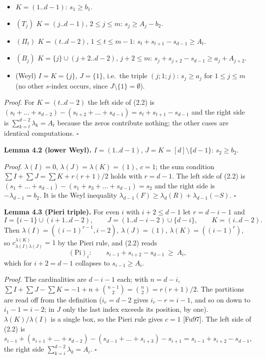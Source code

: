 \documentclass[
  11pt,
  a4paper,
]{article}
\providecommand{\tightlist}{%
  \setlength{\itemsep}{0pt}\setlength{\parskip}{0pt}}
\begin{document}
\begin{itemize}
\tightlist
\item
  \(K=(1..d-1)\): \(s_1\ge b_1\).
\item
  \((T_j)\) \(K=(j..d-1)\), \(2\le j\le m\): \(s_j\ge A_j-b_2\).
\item
  \((\Pi_t)\) \(K=(t..d-2)\), \(1\le t\le m-1\):
  \(s_t+s_{t+1}-s_{d-1}\ge A_t\).
\item
  \((B_j)\) \(K=\{j\}\cup(j+2..d-2)\), \(j+2\le m\):
  \(s_j+s_{j+2}-s_{d-1}\ge a_j+A_{j+2}\).
\item
  (Weyl) \(I=K=\{j\}\), \(J=\{1\}\), i.e.~the triple \((j;\allowbreak{}1;\allowbreak{}j)\):
  \(s_j\ge a_j\) for \(1\le j\le m\) (no other \(s\)-index occurs, since
  \(J\setminus\{1\}=\emptyset\)).
\end{itemize}

\emph{Proof.} For \(K=(t..d-2)\) the left side of (2.2) is
\((s_t+\dots+s_{d-2})-(s_{t+2}+\dots+s_{d-1})=s_t+s_{t+1}-s_{d-1}\) and
the right side is \(\sum_{k=t}^{d-2}\lambda_k=A_t\) because the zeros
contribute nothing; the other cases are identical computations.
\(\square\)

\textbf{Lemma 4.2 (lower Weyl).} \(I=(1..d-1)\),
\(J=K=[d]\setminus\{d-1\}\): \(s_2\ge b_2\).

\emph{Proof.} \(\lambda(I)=0\), \(\lambda(J)=\lambda(K)=(1)\), \(c=1\);
the sum condition \(\sum I+\sum J=\sum K+r(r+1)/2\) holds with
\(r=d-1\). The left side of (2.2) is
\((s_1+\dots+s_{d-1})-(s_1+s_3+\dots+s_{d-1})=s_2\) and the right side
is \(-\lambda_{d-1}=b_2\). It is the Weyl inequality
\(\lambda_{d-1}(F)\ge\lambda_d(R)+\lambda_{d-1}(-S)\). \(\square\)

\textbf{Lemma 4.3 (Pieri triple).} For even \(i\) with \(i+2\le d-1\)
let \(r=d-i-1\) and
\[I=\{i-1\}\cup(i+1..d-2),\qquad J=(1..d-i-2)\cup\{d-i\},\qquad K=(i..d-2).\]
Then \(\lambda(I)=((i-1)^{r-1},\allowbreak{}i-2)\), \(\lambda(J)=(1)\),
\(\lambda(K)=((i-1)^r)\), so \(c^{\lambda(K)}_{\lambda(I)\lambda(J)}=1\)
by the Pieri rule, and (2.2) reads
\[(\mathrm{Pi})_i:\qquad s_{i-1}+s_{i+2}-s_{d-1}\ \ge\ A_i ,\] which for
\(i+2=d-1\) collapses to \(s_{i-1}\ge A_i\).

\emph{Proof.} The cardinalities are \(d-i-1\) each; with \(n=d-i\),
\(\sum I+\sum J-\sum K=-1+n+\binom{n-1}{2}=\binom n2=r(r+1)/2\). The
partitions are read off from the definition (\(i_r=d-2\) gives
\(i_r-r=i-1\), and so on down to \(i_1-1=i-2\); in \(J\) only the last
index exceeds its position, by one). \(\lambda(K)/\lambda(I)\) is a
single box, so the Pieri rule gives \(c=1\) {[}Fu97{]}. The left side of
(2.2) is
\(s_{i-1}+(s_{i+1}+\dots+s_{d-2})-(s_{d-1}+\dots+s_{i+3})-s_{i+1}=s_{i-1}+s_{i+2}-s_{d-1}\),
the right side \(\sum_{k=i}^{d-2}\lambda_k=A_i\). \(\square\)
\end{document}
